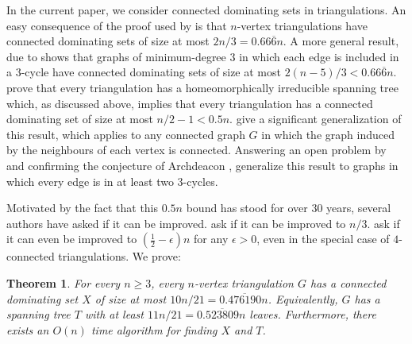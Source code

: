 \documentclass[11pt]{article}
\newtheorem{thm}{Theorem}
\theoremstyle{definition}
\begin{document}
In the current paper, we consider connected dominating sets in triangulations.  An easy consequence of the proof used by \citet{matheson.tarjan:dominating} is that $n$-vertex triangulations have connected dominating sets of size at most $2n/3=0.66\overline{6}n$.  A more general result, due to  \citet{kleitman.west:spanning} shows that graphs of minimum-degree $3$ in which each edge is included in a $3$-cycle have connected dominating sets of size at most $2(n-5)/3<0.66\overline{6}n$. \citet{albertson.berman.ea:graphs} prove that every triangulation has a homeomorphically irreducible spanning tree which, as discussed above, implies that every triangulation has a connected dominating set of size at most $n/2-1<0.5n$.
\citet{chen.ren.ea:homeomorphically} give a significant generalization of this result, which applies to any connected graph $G$ in which the graph induced by the neighbours of each vertex is connected.
Answering an open problem by \citet{albertson.berman.ea:graphs} and confirming the conjecture of Archdeacon \citep{Gross_Tucker_2009}, \citet{CHEN2013409} generalize this result to graphs in which every edge is in at least two $3$-cycles.


Motivated by the fact that this $0.5n$ bound has stood for over 30 years, several authors have asked if it can be improved.  \citet[Question~4.2]{bradshaw.masarik.ea:robust} ask if it can be improved to $n/3$.
 \citet{noguchi.zamfirescu:spanning} ask if it can even be improved to $(\tfrac{1}{2}-\epsilon)n$ for any $\epsilon>0$, even in the special case of $4$-connected triangulations. We prove:

\begin{thm}\label{main_result2}
  For every $n\ge 3$, every $n$-vertex triangulation $G$ has a connected dominating set $X$ of size at most $10n/21= 0.\overline{476190}n$.  Equivalently, $G$ has a spanning tree $T$ with at least $11n/21=0.\overline{523809}n$ leaves.  Furthermore, there exists an $O(n)$ time algorithm for finding $X$ and $T$.
\end{thm}
\end{document}
